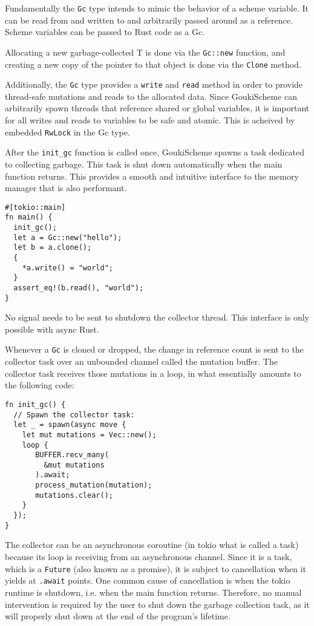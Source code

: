 \documentclass[sigplan,authordraft]{acmart}
\begin{document}
Fundamentally the \texttt{Gc} type intends to mimic the behavior of a scheme variable.
It can be read from and written to and arbitrarily passed around as a
reference. Scheme variables can be passed to Rust code as a Gc. 

Allocating a new garbage-collected T is done via the \texttt{Gc::new} function, and
creating a new copy of the pointer to that object is done via the \texttt{Clone}
method.

Additionally, the \texttt{Gc} type provides a \texttt{write} and \texttt{read}
method in order to provide thread-safe mutations and reads to the allocated
data. Since GoukiScheme can arbitrarily spawn threads that reference shared or
global variables, it is important for all writes and reads to variables to be safe
and atomic. This is acheived by embedded \texttt{RwLock} in the Gc type.

After the \texttt{init\_gc} function is called once, GoukiScheme spawns a task
dedicated to collecting garbage. This task is shut down automatically when the
main function returns. This provides a smooth and intuitive interface to the
memory manager that is also performant.

\begin{verbatim}
#[tokio::main]
fn main() {
  init_gc();
  let a = Gc::new("hello");
  let b = a.clone();
  {
    *a.write() = "world";
  }
  assert_eq!(b.read(), "world");
}
\end{verbatim}

No signal needs to be sent to shutdown the collector thread. This interface is
only possible with async Rust.

Whenever a \texttt{Gc} is cloned or dropped, the change in reference count is
sent to the collector task over an unbounded channel called the mutation buffer.
The collector task receives those mutations in a loop, in what essentially amounts
to the following code:

\begin{verbatim}
fn init_gc() {
  // Spawn the collector task:
  let _ = spawn(async move {
    let mut mutations = Vec::new();
    loop {
       BUFFER.recv_many(
         &mut mutations
       ).await;
       process_mutation(mutation);
       mutations.clear();
    } 
  });
}  
\end{verbatim}

The collector can be an asynchronous coroutine (in tokio what is called a task)
because its loop is receiving from an asynchronous channel. Since it is a task,
which is a \texttt{Future} (also known as a promise), it is subject to
cancellation\cite{cancellation} when it yields at \texttt{.await} points.
One common cause of cancellation is when the tokio runtime is shutdown,
i.e. when the main function returns. Therefore, no manual intervention is
required by the user to shut down the garbage collection task, as it will
properly shut down at the end of the program's lifetime.
\end{document}

